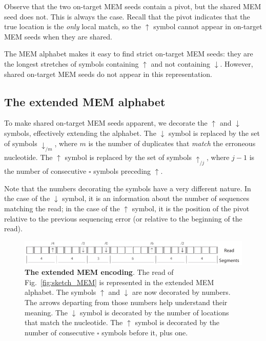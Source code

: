 \documentclass{article}
\begin{document}
Observe that the two on-target MEM seeds contain a pivot, but the shared
MEM seed does not. This is always the case. Recall that the pivot
indicates that the true location is the \emph{only} local match, so the
$\uparrow$ symbol cannot appear in on-target MEM seeds when they are
shared.

The MEM alphabet makes it easy to find strict on-target MEM seeds: they
are the longest stretches of symbols containing $\uparrow$ and not
containing $\downarrow$. However, shared on-target MEM seeds do not appear
in this representation.


\subsection{The extended MEM alphabet}

To make shared on-target MEM seeds apparent, we decorate the $\uparrow$
and $\downarrow$ symbols, effectively extending the alphabet. The
$\downarrow$ symbol is replaced by the set of symbols $\downarrow_{/m}$,
where $m$ is the number of duplicates that \emph{match} the erroneous
nucleotide. The $\uparrow$ symbol is replaced by the set of symbols
$\uparrow_{/j}$, where $j-1$ is the number of consecutive $\square$
symbols preceding $\uparrow$.

Note that the numbers decorating the symbols have a very different nature.
In the case of the $\downarrow$ symbol, it is an information about the
number of sequences matching the read; in the case of the $\uparrow$
symbol, it is the position of the pivot relative to the previous
sequencing error (or relative to the beginning of the read).

\begin{figure}[h]
\centering
\includegraphics[scale=.85]{sketch_extended.pdf}
\caption{\textbf{The extended MEM encoding}.
The read of Fig.~\ref{fig:sketch_MEM} is represented in the extended MEM
alphabet. The symbols $\uparrow$ and $\downarrow$ are now decorated by
numbers. The arrows departing from those numbers help understand their
meaning. The $\downarrow$ symbol is decorated by the number of locations
that match the nucleotide. The $\uparrow$ symbol is decorated by the
number of consecutive $\square$ symbols before it, plus one.}
\label{fig:sketch_extended}
\end{figure}
\end{document}

